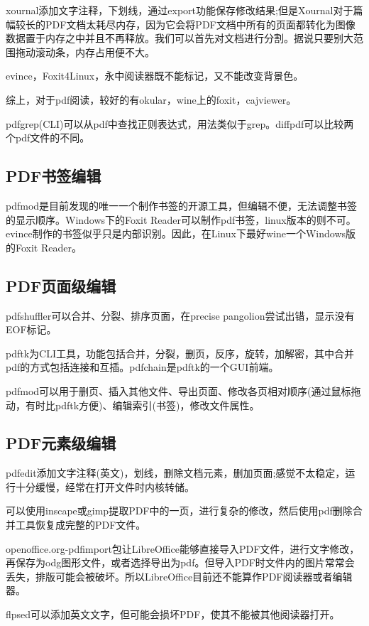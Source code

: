 xournal添加文字注释，下划线，通过export功能保存修改结果;但是Xournal对于篇幅较长的PDF文档太耗尽内存，因为它会将PDF文档中所有的页面都转化为图像数据置于内存之中并且不再释放。我们可以首先对文档进行分割。据说只要别大范围拖动滚动条，内存占用便不大。

evince，Foxit4Linux，永中阅读器既不能标记，又不能改变背景色。

综上，对于pdf阅读，较好的有okular，wine上的foxit，cajviewer。

pdfgrep(CLI)可以从pdf中查找正则表达式，用法类似于grep。diffpdf可以比较两个pdf文件的不同。

\subsection{PDF书签编辑}
pdfmod是目前发现的唯一一个制作书签的开源工具，但编辑不便，无法调整书签的显示顺序。Windows下的Foxit Reader可以制作pdf书签，linux版本的则不可。evince制作的书签似乎只是内部识别。因此，在Linux下最好wine一个Windows版的Foxit Reader。

\subsection{PDF页面级编辑}

pdfshuffler可以合并、分裂、排序页面，在precise pangolion尝试出错，显示没有EOF标记。

pdftk为CLI工具，功能包括合并，分裂，删页，反序，旋转，加解密，其中合并pdf的方式包括连接和互插。pdfchain是pdftk的一个GUI前端。

pdfmod可以用于删页、插入其他文件、导出页面、修改各页相对顺序(通过鼠标拖动，有时比pdftk方便)、编辑索引(书签)，修改文件属性。

\subsection{PDF元素级编辑}
pdfedit添加文字注释(英文)，划线，删除文档元素，删加页面;感觉不太稳定，运行十分缓慢，经常在打开文件时内核转储。

可以使用inscape或gimp提取PDF中的一页，进行复杂的修改，然后使用pdf删除合并工具恢复成完整的PDF文件。

openoffice.org-pdfimport包让LibreOffice能够直接导入PDF文件，进行文字修改，再保存为odg图形文件，或者选择导出为pdf。但导入PDF时文件内的图片常常会丢失，排版可能会被破坏。所以LibreOffice目前还不能算作PDF阅读器或者编辑器。

flpsed可以添加英文文字，但可能会损坏PDF，使其不能被其他阅读器打开。

